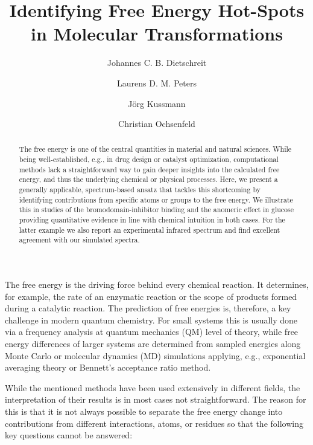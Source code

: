 \documentclass[journal=jpclcd,manuscript=article]{achemso}
\author{Johannes C. B. Dietschreit}
\author{Laurens D. M. Peters}
\author{J\"org Kussmann}
\author{Christian Ochsenfeld}
\affiliation[Univerity of Munich]{Chair of Theoretical Chemistry,  Department of Chemistry, University of Munich (LMU), Butenandtstr.~7, D-81377 M\"unchen, Germany}
\title{Identifying Free Energy Hot-Spots\\ in Molecular Transformations}
\begin{document}
\begin{abstract}
 The free energy is one of the central quantities in material and natural sciences. While being well-established, e.g., in drug design or catalyst optimization, computational methods lack a straightforward way to gain deeper insights into the calculated free energy, and thus the underlying chemical or physical processes. Here, we present a generally applicable, spectrum-based ansatz that tackles this shortcoming by identifying contributions from specific atoms or groups to the free energy. We illustrate this in studies of the bromodomain-inhibitor binding and the anomeric effect in glucose providing quantitative evidence in line with chemical intuition in both cases. For the latter example we also report an experimental infrared spectrum and find excellent agreement with our simulated spectra.
\end{abstract}

The free energy is the driving force behind every chemical reaction. It determines, for example, the rate of an enzymatic reaction or the scope of products formed during a catalytic reaction. The prediction of free energies is, therefore, a key challenge in modern quantum chemistry\cite{Chipot2007,Hansen2014}. For small systems this is usually done via a frequency analysis at quantum mechanics (QM) level of theory, while free energy differences of larger systems are determined from sampled energies along Monte Carlo\cite{Metropolis1953,Hastings1970} or molecular dynamics (MD)\cite{Fermi1955,Alder1959,Rahman1964} simulations applying, e.g., exponential averaging theory\cite{Zwanzig1954} or Bennett's acceptance ratio method\cite{Bennett1976}.

While the mentioned methods have been used extensively in different fields\cite{Rickman2002,Karplus1990,Gao1989,Bash1987a}, the interpretation of their results is in most cases not straightforward. The reason for this is that it is not always possible to separate the free energy change into contributions from different interactions, atoms, or residues so that the following key questions cannot be answered:
\end{document}
